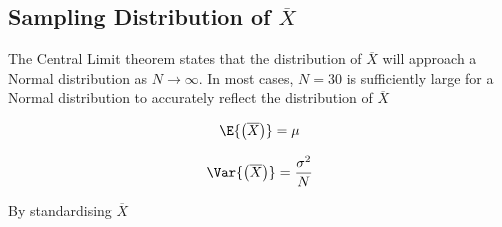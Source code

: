 \documentclass{article}
\begin{document}
\subsection{Sampling Distribution of \texorpdfstring{$\overline{X}$}{Xbar}}
The Central Limit theorem states that the distribution of $\overline{X}$ will approach a 
Normal distribution as $N \to \infty$. In most cases, $N = 30$ is sufficiently large for
a Normal distribution to accurately reflect the distribution of $\overline{X}$
\begin{theorem}
    \begin{equation*}
        \E{\left( \overline{X} \right)} = \mu
    \end{equation*}
\end{theorem}
\begin{theorem}
    \begin{equation*}
        \Var{\left( \overline{X} \right)} = \frac{\sigma^2}{N}
    \end{equation*}
\end{theorem}
By standardising $\overline{X}$
\end{document}
